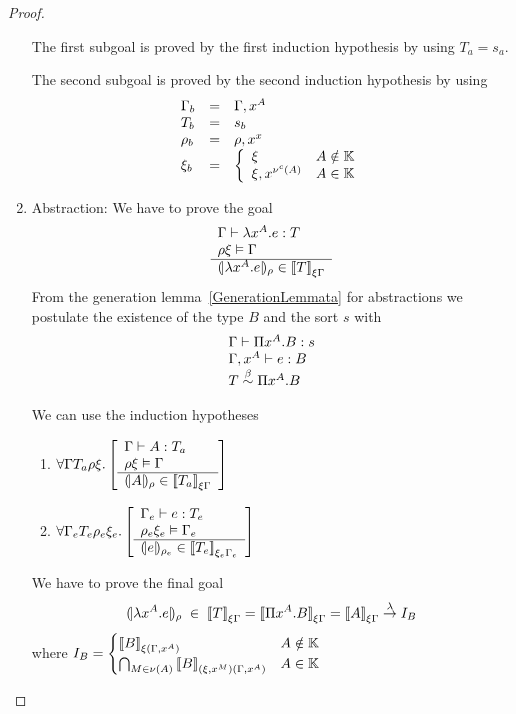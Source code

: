 \begin{theorem}
\begin{proof}
\begin{enumerate}
            The first subgoal is proved by the first induction hypothesis by
            using $T_a = s_a$.

            The second subgoal is proved by the second induction hypothesis by
            using
            $$
            \begin{array}{lll}
                \Gamma_b &=& \Gamma,x^A
                \\
                T_b      &=& s_b
                \\
                \rho_b   &=& \rho,x^x
                \\
                \xi_b    &=&
                    \left\{
                    \begin{array}{ll}
                        \xi & A \notin \mathbb{K}
                        \\
                        \xi,x^{\nu^c(A)}  & A \in \mathbb{K}
                    \end{array}
                    \right.
            \end{array}
            $$

        \item Abstraction: We have to prove the goal
            $$
                \begin{array}{l}  \Gamma \vdash \lambda x^A.e : T \\ \rho \xi \vDash \Gamma  \\ \hline  {(\!|\lambda x^A.e|\!)_{\rho}} \in {{{[\![}T {]\!]}}_{\xi\Gamma}} \end{array}
            $$
            From the generation lemma~\ref{GenerationLemmata} for abstractions
            we postulate the existence of the type $B$ and the sort $s$ with
            $$
            \begin{array}{l}
                \Gamma \vdash \Pi x^A. B : s
                \\
                \Gamma,x^A \vdash e : B
                \\
                T \stackrel{\beta}{\sim} \Pi x^A. B
            \end{array}
            $$

            We can use the induction hypotheses
            \begin{enumerate}
            \item
                $\forall \Gamma T_a \rho \xi. \left[ \begin{array}{l}  \Gamma \vdash A : T_a \\ \rho \xi \vDash \Gamma  \\ \hline  {(\!|A|\!)_{\rho}} \in {{{[\![}T_a {]\!]}}_{\xi\Gamma}} \end{array} \right]$

            \item
                $\forall \Gamma_e T_e \rho_e \xi_e. \left[ \begin{array}{l}  \Gamma_e \vdash e : T_e \\ \rho_e \xi_e \vDash \Gamma_e  \\ \hline  {(\!|e|\!)_{\rho_e}} \in {{{[\![}T_e {]\!]}}_{\xi_e\Gamma_e}} \end{array} \right]$
            \end{enumerate}

            We have to prove the final goal
            $$
            \terminter{\lambda x^A. e}{\rho}
            \;\in\;
            \typeinter{T}{\xi\Gamma}
            = \typeinter{\Pi x^A.B}{\xi\Gamma}
            = \typeinter{A}{\xi\Gamma} \tolambda I_B
            $$
            where
            $
            I_B =
            \begin{cases}
                {{{[\![}B {]\!]}}_{\xi(\Gamma,x^A)}} & A \notin \mathbb{K}
                \\
                \bigcap_{M \in \nu(A)}
                {{{[\![} B {]\!]}}_{(\xi,x^M)(\Gamma,x^A)}} & A \in \mathbb{K}
            \end{cases}
            $


\end{enumerate}
\end{proof}
\end{theorem}
